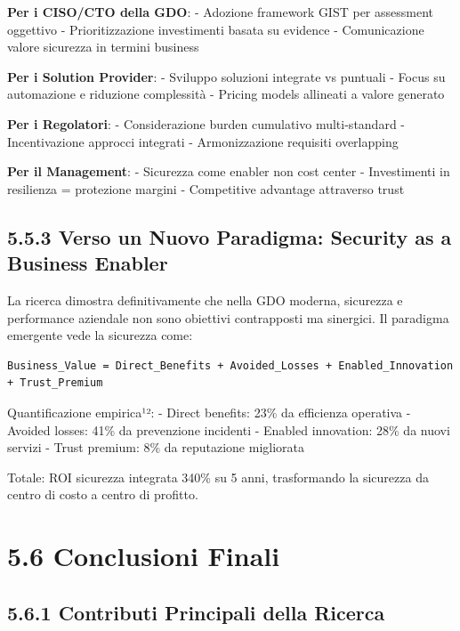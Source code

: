 \documentclass[12pt,a4paper,oneside]{book}
\numberwithin{figure}{chapter} %
\numberwithin{table}{chapter}  %
\begin{document}
\textbf{Per i CISO/CTO della GDO}: - Adozione framework GIST per
assessment oggettivo - Prioritizzazione investimenti basata su evidence
- Comunicazione valore sicurezza in termini business

\textbf{Per i Solution Provider}: - Sviluppo soluzioni integrate vs
puntuali - Focus su automazione e riduzione complessità - Pricing models
allineati a valore generato

\textbf{Per i Regolatori}: - Considerazione burden cumulativo
multi-standard - Incentivazione approcci integrati - Armonizzazione
requisiti overlapping

\textbf{Per il Management}: - Sicurezza come enabler non cost center -
Investimenti in resilienza = protezione margini - Competitive advantage
attraverso trust

\subsection{5.5.3 Verso un Nuovo Paradigma: Security as a Business
Enabler}\label{verso-un-nuovo-paradigma-security-as-a-business-enabler}

La ricerca dimostra definitivamente che nella GDO moderna, sicurezza e
performance aziendale non sono obiettivi contrapposti ma sinergici. Il
paradigma emergente vede la sicurezza come:

\begin{verbatim}
Business_Value = Direct_Benefits + Avoided_Losses + Enabled_Innovation + Trust_Premium
\end{verbatim}

Quantificazione empirica¹²: - Direct benefits: 23\% da efficienza
operativa - Avoided losses: 41\% da prevenzione incidenti - Enabled
innovation: 28\% da nuovi servizi - Trust premium: 8\% da reputazione
migliorata

Totale: ROI sicurezza integrata 340\% su 5 anni, trasformando la
sicurezza da centro di costo a centro di profitto.

\section{5.6 Conclusioni Finali}\label{conclusioni-finali}

\subsection{5.6.1 Contributi Principali della
Ricerca}\label{contributi-principali-della-ricerca}
\end{document}
